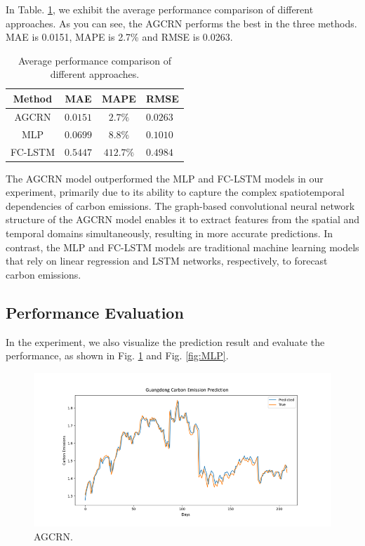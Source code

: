\documentclass[sigconf, authordraft]{acmart}
\begin{document}
	In Table. \ref{Average performance}, we exhibit the average performance comparison
	of different approaches. As you can see, the AGCRN performs the best in the three
	methods. MAE is 0.0151, MAPE is 2.7\% and RMSE is 0.0263.

	\begin{table}
		\caption{Average performance comparison of different approaches.}
		\label{Average performance}
		\begin{tabular}{cccl}
			\toprule Method & MAE      & MAPE      & RMSE     \\
			\midrule AGCRN  & $0.0151$ & $2.7\%$   & $0.0263$ \\
			MLP             & $0.0699$ & $8.8\%$   & $0.1010$ \\
			FC-LSTM         & $0.5447$ & $412.7\%$ & $0.4984$ \\
			\bottomrule
		\end{tabular}
	\end{table}

	The AGCRN model outperformed the MLP and FC-LSTM models in our experiment,
	primarily due to its ability to capture the complex spatiotemporal
	dependencies of carbon emissions. The graph-based convolutional neural network
	structure of the AGCRN model enables it to extract features from the spatial and
	temporal domains simultaneously, resulting in more accurate predictions. In contrast,
	the MLP and FC-LSTM models are traditional machine learning models that rely
	on linear regression and LSTM networks, respectively, to forecast carbon
	emissions.

	\subsection{Performance Evaluation }
	In the experiment, we also visualize the prediction result and evaluate the performance,
	as shown in Fig. \ref{fig:AGCRN} and Fig. \ref{fig:MLP}.

	\begin{figure}[h]
		\centering
		\includegraphics[width=\columnwidth]{figures/AGCRN.png}
		\caption{AGCRN.}
		\label{fig:AGCRN}
	\end{figure}
\end{document}
